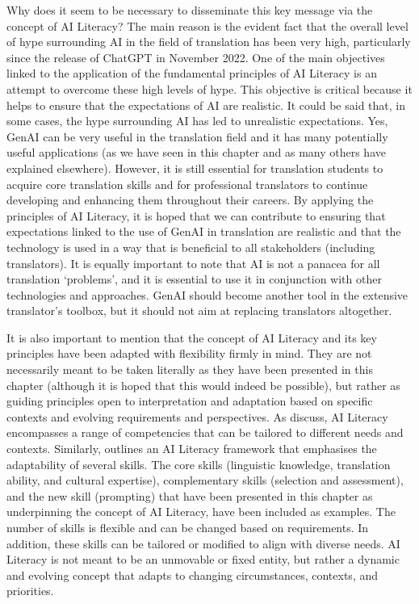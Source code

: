 \documentclass[output=paper]{langscibook}
\begin{document}
Why does it seem to be necessary to disseminate this key message via the concept of AI Literacy? The main reason is the evident fact that the overall level of hype surrounding AI in the field of translation has been very high, particularly since the release of ChatGPT in November 2022. One of the main objectives linked to the application of the fundamental principles of AI Literacy is an attempt to overcome these high levels of hype. This objective is critical because it helps to ensure that the expectations of AI are realistic. It could be said that, in some cases, the hype surrounding AI has led to unrealistic expectations. Yes, GenAI can be very useful in the translation field and it has many potentially useful applications (as we have seen in this chapter and as many others have explained elsewhere). However, it is still essential for translation students to acquire core translation skills and for professional translators to continue developing and enhancing them throughout their careers. By applying the principles of AI Literacy, it is hoped that we can contribute to ensuring that expectations linked to the use of GenAI in translation are realistic and that the technology is used in a way that is beneficial to all stakeholders (including translators). It is equally important to note that AI is not a panacea for all translation ‘problems’, and it is essential to use it in conjunction with other technologies and approaches. GenAI should become another tool in the extensive translator’s toolbox, but it should not aim at replacing translators altogether.

It is also important to mention that the concept of AI Literacy and its key principles have been adapted with flexibility firmly in mind. They are not necessarily meant to be taken literally as they have been presented in this chapter (although it is hoped that this would indeed be possible), but rather as guiding principles open to interpretation and adaptation based on specific contexts and evolving requirements and perspectives. As \citet{longmagerko2020} discuss, AI Literacy encompasses a range of competencies that can be tailored to different needs and contexts. Similarly, \citet{kruger24_AI_literacy_framework} outlines an AI Literacy framework that emphasises the adaptability of several skills. The core skills (linguistic knowledge, translation ability, and cultural expertise), complementary skills (selection and assessment), and the new skill (prompting) that have been presented in this chapter as underpinning the concept of AI Literacy, have been included as examples. The number of skills is flexible and can be changed based on requirements. In addition, these skills can be tailored or modified to align with diverse needs. AI Literacy is not meant to be an unmovable or fixed entity, but rather a dynamic and evolving concept that adapts to changing circumstances, contexts, and priorities.
\end{document}
